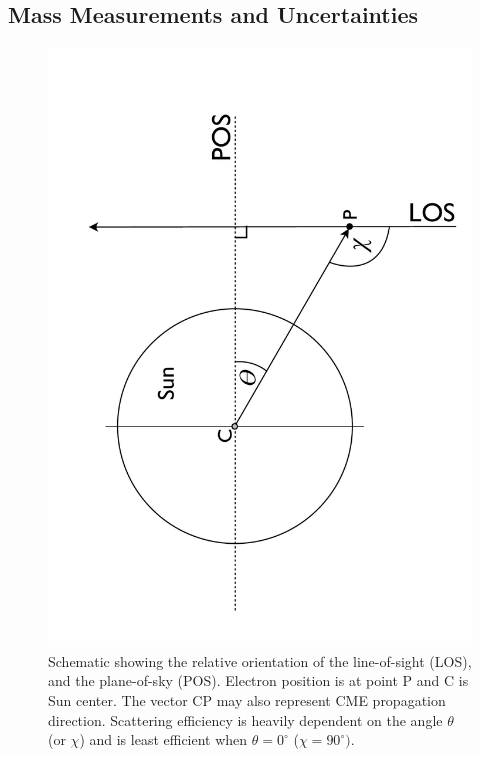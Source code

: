 \subsection{Mass Measurements and Uncertainties}
\begin{figure}[t!]
\begin{center}
\includegraphics[trim = 0cm 0cm 0cm 0cm, scale=0.4, angle=270]{images/LOS_POS_2.pdf}
\caption[Line-of-sight and plane-of-sky orientations]{Schematic showing the relative orientation of the line-of-sight (LOS), and the plane-of-sky (POS). Electron position is at point P and C is 
Sun center. The vector CP may also represent CME propagation direction. Scattering efficiency is heavily dependent on the angle $\theta$ 
(or $\chi$) and is least efficient 
when $\theta = 0^{\circ}$ ($\chi=90^{\circ})$.}
\label{fig:LOS_POS_2}
\end{center}
\end{figure}
